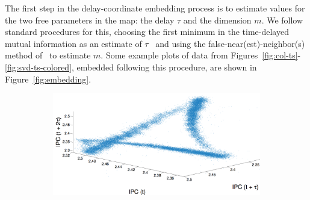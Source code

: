 The first step in the delay-coordinate embedding process is to
estimate values for the two free parameters in the map: the delay
$\tau$ and the dimension $m$.  We follow standard procedures for this,
choosing the first minimum in the time-delayed mutual information as
an estimate of $\tau$~\cite{fraser-swinney} and using the
false-near(est)-neighbor(s) method of~\cite{KBA92} to estimate $m$.
Some example plots of data from
Figures~\ref{fig:col-ts}-\ref{fig:svd-ts-colored}, embedded following
this procedure, are shown in Figure~\ref{fig:embedding}.
 \begin{figure}
   \centering
\begin{subfigure}{\columnwidth}
    \includegraphics[width=\columnwidth]{figs/colipc3d.png}
    \caption{\col }
    \label{fig:colEmbedding}
  \end{subfigure}%
  

\end{figure}
